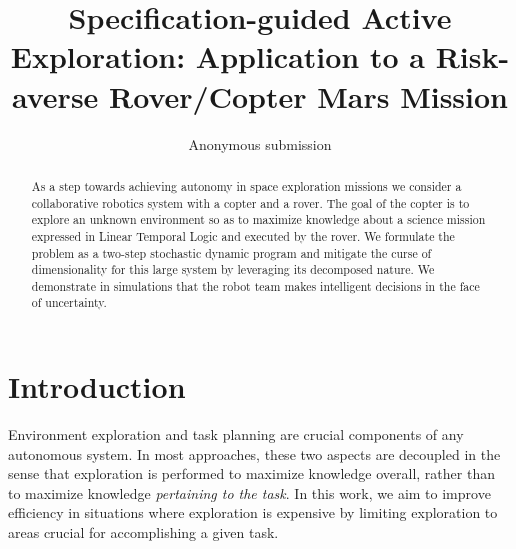 \documentclass[conference]{IEEEtran}
\begin{document}



\title{\huge Specification-guided Active Exploration: Application to a Risk-averse Rover/Copter Mars Mission}



\author{Anonymous submission}

\maketitle

\begin{abstract}
  As a step towards achieving autonomy in space exploration missions we consider a collaborative robotics system with a copter and a rover. The goal of the copter is to explore an unknown environment so as to maximize knowledge about a science mission expressed in Linear Temporal Logic and executed by the rover. We formulate the problem as a two-step stochastic dynamic program and mitigate the curse of dimensionality for this large system by leveraging its decomposed nature. We demonstrate in simulations that the robot team makes intelligent decisions in the face of uncertainty.
\end{abstract}

\IEEEpeerreviewmaketitle



\section{Introduction}

Environment exploration and task planning are crucial components of any autonomous system. In most approaches, these two aspects are decoupled in the sense that exploration is performed to maximize knowledge overall, rather than to maximize knowledge \emph{pertaining to the task}. In this work, we aim to improve efficiency in situations where exploration is expensive by limiting exploration to areas crucial for accomplishing a given task.
\end{document}
